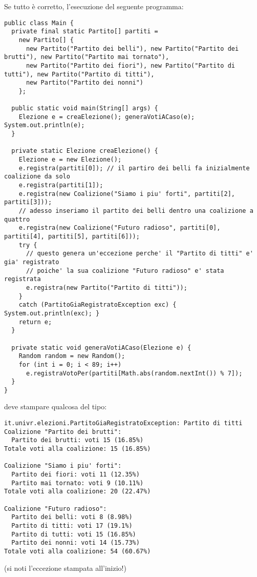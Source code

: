 \documentclass{article}[10pt]
\begin{document}
\vspace*{2ex}

Se tutto \`e corretto, l'esecuzione del seguente programma:

{\small
\begin{verbatim}
public class Main {
  private final static Partito[] partiti =
    new Partito[] {
      new Partito("Partito dei belli"), new Partito("Partito dei brutti"), new Partito("Partito mai tornato"),
      new Partito("Partito dei fiori"), new Partito("Partito di tutti"), new Partito("Partito di titti"),
      new Partito("Partito dei nonni")
    };

  public static void main(String[] args) {
    Elezione e = creaElezione(); generaVotiACaso(e); System.out.println(e);
  }

  private static Elezione creaElezione() {
    Elezione e = new Elezione();
    e.registra(partiti[0]); // il partiro dei belli fa inizialmente coalizione da solo
    e.registra(partiti[1]);  
    e.registra(new Coalizione("Siamo i piu' forti", partiti[2], partiti[3]));
    // adesso inseriamo il partito dei belli dentro una coalizione a quattro
    e.registra(new Coalizione("Futuro radioso", partiti[0], partiti[4], partiti[5], partiti[6]));
    try {
      // questo genera un'eccezione perche' il "Partito di titti" e' gia' registrato
      // poiche' la sua coalizione "Futuro radioso" e' stata registrata
      e.registra(new Partito("Partito di titti"));
    }
    catch (PartitoGiaRegistratoException exc) { System.out.println(exc); }
    return e;
  }

  private static void generaVotiACaso(Elezione e) {
    Random random = new Random();
    for (int i = 0; i < 89; i++)
      e.registraVotoPer(partiti[Math.abs(random.nextInt()) % 7]);
  }
}
\end{verbatim}}

\noindent
deve stampare qualcosa del tipo:

{\small
\begin{verbatim}
it.univr.elezioni.PartitoGiaRegistratoException: Partito di titti
Coalizione "Partito dei brutti":
  Partito dei brutti: voti 15 (16.85%)
Totale voti alla coalizione: 15 (16.85%)

Coalizione "Siamo i piu' forti":
  Partito dei fiori: voti 11 (12.35%)
  Partito mai tornato: voti 9 (10.11%)
Totale voti alla coalizione: 20 (22.47%)

Coalizione "Futuro radioso":
  Partito dei belli: voti 8 (8.98%)
  Partito di titti: voti 17 (19.1%)
  Partito di tutti: voti 15 (16.85%)
  Partito dei nonni: voti 14 (15.73%)
Totale voti alla coalizione: 54 (60.67%)
\end{verbatim}}

\noindent
(si noti l'eccezione stampata all'inizio!)
\end{document}
